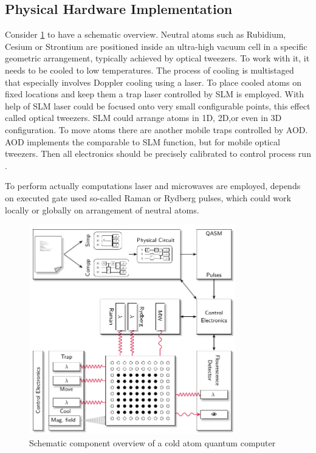 \subsection{Physical Hardware Implementation}
Consider \ref{fig:ColdAtomArchitecture} to have a schematic overview.
Neutral atoms such as Rubidium, Cesium or Strontium are positioned inside an ultra-high vacuum cell 
in a specific geometric arrangement, typically achieved by optical tweezers. 
To work with it, it needs to be cooled to low temperatures.
The process of cooling is multistaged that especially involves Doppler cooling using a laser.
To place cooled atoms on fixed locations and keep them a trap laser controlled by \ac{SLM} is employed.
With help of \ac{SLM} laser could be focused onto very small configurable points, this effect called optical tweezers.
\ac{SLM} could arrange atoms in 1D, 2D,or even in 3D configuration.
To move atoms there are another mobile traps controlled by \ac{AOD}.
\ac{AOD} implements the comparable to \ac{SLM} function, but for mobile optical tweezers.
Then all electronics should be precisely calibrated to control process run \parencite{Schmid_2024_NeutralAtomBasics, Wintersperger_2023}.

To perform actually computations laser and microwaves are employed, 
depends on executed gate used so-called Raman or Rydberg pulses, 
which could work locally or globally on arrangement of neutral atoms. 
\parencite{Schmid_2024_NeutralAtomBasics, Wintersperger_2023}
\begin{figure}[htbp]
  \centering
    \includegraphics[width=0.8\textwidth]{figures/ColdAtomArchitecture.pdf}
    \caption{Schematic component overview of a cold atom quantum computer \parencite{Wintersperger_2023}}
    \label{fig:ColdAtomArchitecture}
\end{figure}

